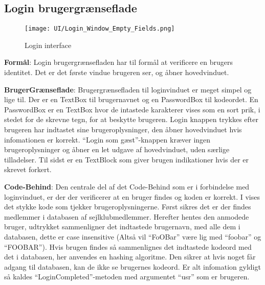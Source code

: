 \subsection{Login brugergrænseflade}
\begin{wrapfigure}{r}{0.5\textwidth}
    \label{img:login_interface}
    \vspace{-20pt}
    \begin{center}
        \texttt{[image: UI/Login\_Window\_Empty\_Fields.png]}
    \end{center}
    \vspace{-15pt}
    \caption{Login interface}
\end{wrapfigure}
 
\textbf{Formål}: 
Login brugergrænsefladen har til formål at verificere en brugers identitet. 
Det er det første vindue brugeren ser, og åbner hovedvinduet.
 
\textbf{BrugerGrænseflade}: 
Brugergrænsefladen til loginvinduet er meget simpel og lige til. 
Der er en TextBox til brugernavnet og en PasswordBox til kodeordet.
En PasswordBox er en TextBox hvor de intastede karakterer vises som en sort prik, i stedet for de skrevne tegn, for at beskytte brugeren.
Login knappen trykkes efter brugeren har indtastet sine brugeroplysninger, den åbner hovedvinduet hvis infomationen er korrekt.
``Login som gæst''-knappen kræver ingen brugeroplysninger og åbner en let udgave af hovedvinduet, uden særlige tilladelser.
Til sidst er en TextBlock som giver brugen indikationer hvis der er skrevet forkert.
 
\textbf{Code-Behind}: 
Den centrale del af det Code-Behind som er i forbindelse med loginvinduet, er der der verificerer at en bruger findes og koden er korrekt.
I  vises det stykke kode som tjekker brugeroplysningerne.
Først sikres det er der findes medlemmer i databasen af sejlklubmedlemmer.
Herefter hentes den anmodede bruger, udtrykket sammenligner det indtastede brugernavn, med alle dem i databasen, dette er case insensitive (Altså vil ``FoOBar'' være lig med ``foobar'' og ``FOOBAR'').
Hvis brugen findes så sammenlignes det indtastede kodeord med det i databasen, her anvendes en hashing algoritme. 
Den sikrer at hvis noget får adgang til databasen, kan de ikke se brugernes kodeord.
Er alt infomation gyldigt så kaldes ``LoginCompleted''-metoden med argumentet ``usr'' som er brugeren. 
 
